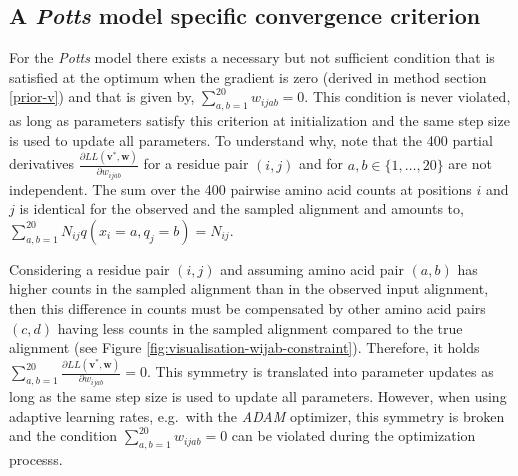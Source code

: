 \documentclass[11pt,a4paper,twoside]{book}
\newcommand{\eq}{\!=\!}
\renewcommand{\v}{\mathbf{v}}
\newcommand{\w}{\mathbf{w}}
\newcommand{\wijab}{w_{ijab}}
\theoremstyle{definition}
\theoremstyle{definition}
\theoremstyle{remark}
\begin{document}
\subsection{\texorpdfstring{A \emph{Potts} model specific convergence
criterion}{A Potts model specific convergence criterion}}\label{adam-violates-sum-wij}

For the \emph{Potts} model there exists a necessary but not sufficient
condition that is satisfied at the optimum when the gradient is zero
(derived in method section \ref{prior-v}) and that is given by,
\(\sum_{a,b=1}^{20} \wijab = 0\). This condition is never violated, as
long as parameters satisfy this criterion at initialization and the same
step size is used to update all parameters. To understand why, note that
the 400 partial derivatives
\(\frac{\partial L\!L(\v^*, \w)}{\partial \wijab}\) for a residue pair
\((i,j)\) and for \(a,b \in \{1, \ldots, 20\}\) are not independent. The
sum over the 400 pairwise amino acid counts at positions \(i\) and \(j\)
is identical for the observed and the sampled alignment and amounts to,
\(\sum_{a,b=1}^{20} N_{ij} q(x_i \eq a, q_j \eq b) = N_{ij}\).

Considering a residue pair \((i,j)\) and assuming amino acid pair
\((a,b)\) has higher counts in the sampled alignment than in the
observed input alignment, then this difference in counts must be
compensated by other amino acid pairs \((c,d)\) having less counts in
the sampled alignment compared to the true alignment (see Figure
\ref{fig:visualisation-wijab-constraint}). Therefore, it holds
\(\sum_{a,b=1}^{20} \frac{\partial L\!L(\v^*, \w)}{\partial \wijab} = 0\).
This symmetry is translated into parameter updates as long as the same
step size is used to update all parameters. However, when using adaptive
learning rates, e.g.~with the \emph{ADAM} optimizer, this symmetry is
broken and the condition \(\sum_{a,b=1}^{20} \wijab = 0\) can be
violated during the optimization processs.
\end{document}
